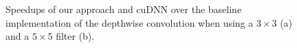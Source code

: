\begin{figure}
\centering
	

\vspace{-2mm} \caption{Speedups of our approach and cuDNN over the baseline implementation of the depthwise convolution when using a
$3\times 3$ (a) and a $5\times 5$ filter (b).} \label{fig:3druntime}
\vspace{-2mm}
\end{figure}


